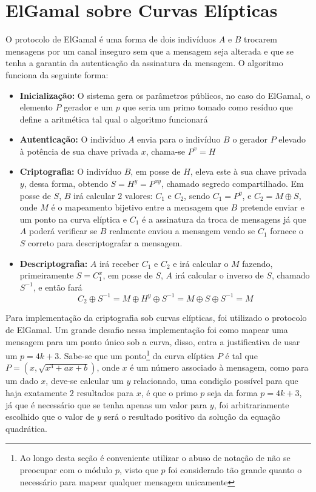 \documentclass[14pt, oneside]{book}
\newcommand\tab[1][1cm]{\hspace*{#1}}
\theoremstyle{definition}
\begin{document}
            \section{ElGamal sobre Curvas Elípticas}
                \tab O protocolo de ElGamal é uma forma de dois indivíduos $A$ e $B$ trocarem mensagens por um canal inseguro sem que a mensagem seja alterada e que se tenha a garantia da autenticação da assinatura da mensagem. O algoritmo funciona da seguinte forma:
                \begin{itemize}
                    \item \textbf{Inicialização:} O sistema gera os parâmetros públicos, no caso do ElGamal, o elemento $P$ gerador e um $p$ que seria um primo tomado como resíduo que define a aritmética tal qual o algoritmo funcionará
                    \item \textbf{Autenticação:} O indivíduo $A$ envia para o indivíduo $B$ o gerador $P$ elevado à potência de sua chave privada $x$, chama-se $P^x = H$
                    \item \textbf{Criptografia:} O indivíduo $B$, em posse de $H$, eleva este à sua chave privada $y$, dessa forma, obtendo $S = H^y = P^{xy}$, chamado segredo compartilhado. Em posse de $S$, $B$ irá calcular $2$ valores: $C_1$ e $C_2$, sendo $C_1 = P^y$, e $C_2 = M\oplus S$, onde $M$ é o mapeamento bijetivo entre a mensagem que $B$ pretende enviar e um ponto na curva elíptica e $C_1$ é a assinatura da troca de mensagens já que $A$ poderá verificar se $B$ realmente enviou a mensagem vendo se $C_1$ fornece o $S$ correto para descriptografar a mensagem.
                    \item \textbf{Descriptografia:} $A$ irá receber $C_1$ e $C_2$ e irá calcular o $M$ fazendo, primeiramente $S = C_1^x$, em posse de $S$, $A$ irá calcular o inverso de $S$, chamado $S^{-1}$, e então fará $$C_2\oplus S^{-1} = M\oplus H^y \oplus S^{-1} = M\oplus S \oplus S^{-1} = M$$
                \end{itemize}
                \tab Para implementação da criptografia sob curvas elípticas, foi utilizado o protocolo de ElGamal. Um grande desafio nessa implementação foi como mapear uma mensagem para um ponto único sob a curva, disso, entra a justificativa de usar um $p=4k+3$. Sabe-se que um ponto\footnote{Ao longo desta seção é conveniente utilizar o abuso de notação de não se preocupar com o módulo $p$, visto que $p$ foi considerado tão grande quanto o necessário para mapear qualquer mensagem unicamente} da curva elíptica $P$ é tal que $P=(x,\sqrt{x^3 + ax + b})$, onde $x$ é um número associado à mensagem, como para um dado $x$, deve-se calcular um $y$ relacionado, uma condição possível para que haja exatamente $2$ resultados para $x$, é que o primo $p$ seja da forma $p = 4k+3$, já que é necessário que se tenha apenas um valor para $y$, foi arbitrariamente escolhido que o valor de $y$ será o resultado positivo da solução da equação quadrática.
                
\end{document}
